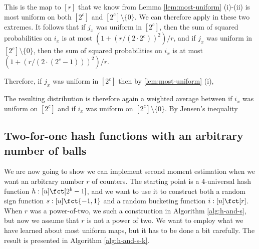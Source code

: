 This is the map 
to $[r]$ that we know from Lemma \ref{lem:most-uniform} (i)-(ii) 
is most uniform on both $[2^c]$ and $[2^c]\setminus\{0\}$. We
can therefore apply  in these two 
extremes. It follows that if $j_x$ was uniform in 
$[2^c]$, then the sum of squared probabilities on $i_x$ is
at most $(1+(r/(2\cdot 2^c))^2)/r$, and if $j_x$ was uniform in 
$[2^c]\setminus\{0\}$, then the sum of squared probabilities on $i_x$ is
at most $(1+(r/(2\cdot (2^c-1)))^2)/r$.

Therefore, if $j_x$ was uniform in $[2^c]$ then by  \ref{lem:most-uniform} (i),



The resulting distribution is therefore again a weighted average
between if $i_x$ was uniform on $[2^c]$ and
if $i_x$ was uniform on $[2^c]\setminus\{0\}$. By Jensen's inequality




\subsection{Two-for-one hash functions with an arbitrary number of balls}
We are now going to show we can implement second moment estimation when
we want an arbitrary number $r$ of counters. The starting point
is a 4-universal hash function $h:[u]\fct[2^b-1]$, and we want to
use it to construct both a random sign function $s:[u]\fct\{-1,1\}$ and 
a random bucketing function $i:[u]\fct[r]$. When $r$ was a power-of-two, 
we such a construction in Algorithm \ref{alg:h-and-s}, but now we
assume that $r$ is not a power of two. We want to employ what we
have learned about most uniform maps, but it has to be done a bit
carefully. The result is presented in Algorithm \ref{alg:h-and-s-k}.

